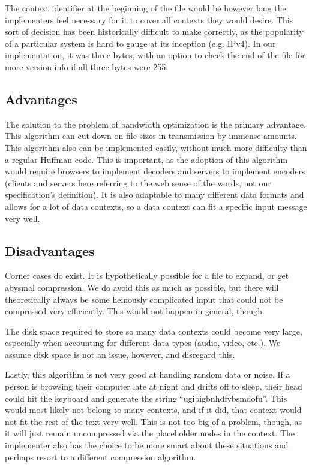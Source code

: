 The context identifier at the beginning of the file would be however long the implementers feel necessary for it to cover all contexts they would desire. This sort of decision has been historically difficult to make correctly, as the popularity of a particular system is hard to gauge at its inception (e.g. IPv4). In our implementation, it was three bytes, with an option to check the end of the file for more version info if all three bytes were 255. 

\subsection{Advantages}
The solution to the problem of bandwidth optimization is the primary advantage. This algorithm can cut down on file sizes in transmission by immense amounts. This algorithm also can be implemented easily, without much more difficulty than a regular Huffman code. This is important, as the adoption of this algorithm would require browsers to implement decoders and servers to implement encoders (clients and servers here referring to the web sense of the words, not our specification's definition). It is also adaptable to many different data formats and allows for a lot of data contexts, so a data context can fit a specific input message very well.

\subsection{Disadvantages}
Corner cases do exist. It is hypothetically possible for a file to expand, or get abysmal compression. We do avoid this as much as possible, but there will theoretically always be some heinously complicated input that could not be compressed very efficiently. This would not happen in general, though.

The disk space required to store so many data contexts could become very large, especially when accounting for different data types (audio, video, etc.). We assume disk space is not an issue, however, and disregard this.

Lastly, this algorithm is not very good at handling random data or noise. If a person is browsing their computer late at night and drifts off to sleep, their head could hit the keyboard and generate the string ``ugibigbnhdfvbsmdofu''. This would most likely not belong to many contexts, and if it did, that context would not fit the rest of the text very well. This is not too big of a problem, though, as it will just remain uncompressed via the placeholder nodes in the context. The implementer also has the choice to be more smart about these situations and perhaps resort to a different compression algorithm.

